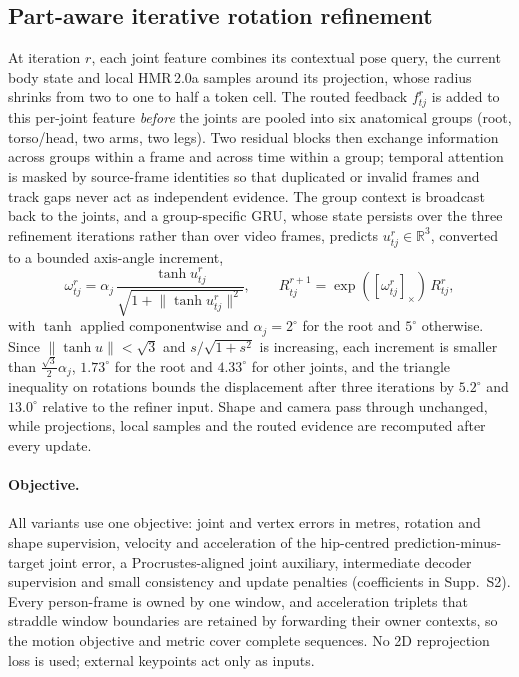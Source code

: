 \subsection{Part-aware iterative rotation refinement}
\label{sec:refiner}

At iteration $r$, each joint feature combines its contextual pose query, the current body state and local HMR\,2.0a samples around its projection, whose radius shrinks from two to one to half a token cell.
The routed feedback $f^r_{tj}$ is added to this per-joint feature \emph{before} the joints are pooled into six anatomical groups (root, torso/head, two arms, two legs).
Two residual blocks then exchange information across groups within a frame and across time within a group; temporal attention is masked by source-frame identities so that duplicated or invalid frames and track gaps never act as independent evidence.
The group context is broadcast back to the joints, and a group-specific GRU, whose state persists over the three refinement iterations rather than over video frames, predicts $u^r_{tj}\in\mathbb{R}^3$, converted to a bounded axis-angle increment,
\begin{equation}
  \omega^r_{tj} = \alpha_j\,\frac{\tanh u^r_{tj}}{\sqrt{1+\lVert\tanh u^r_{tj}\rVert^2}},\qquad R^{r+1}_{tj} = \exp([\omega^r_{tj}]_\times)\,R^r_{tj},
  \label{eq:bound}
\end{equation}
with $\tanh$ applied componentwise and $\alpha_j=2^\circ$ for the root and $5^\circ$ otherwise.
Since $\lVert\tanh u\rVert<\sqrt3$ and $s/\sqrt{1+s^2}$ is increasing, each increment is smaller than $\tfrac{\sqrt3}{2}\alpha_j$, \ie $1.73^\circ$ for the root and $4.33^\circ$ for other joints, and the triangle inequality on rotations bounds the displacement after three iterations by $5.2^\circ$ and $13.0^\circ$ relative to the refiner input.
Shape and camera pass through unchanged, while projections, local samples and the routed evidence are recomputed after every update.

\paragraph{Objective.}
All variants use one objective: joint and vertex errors in metres, rotation and shape supervision, velocity and acceleration of the hip-centred prediction-minus-target joint error, a Procrustes-aligned joint auxiliary, intermediate decoder supervision and small consistency and update penalties (coefficients in Supp.~S2).
Every person-frame is owned by one window, and acceleration triplets that straddle window boundaries are retained by forwarding their owner contexts, so the motion objective and metric cover complete sequences.
No 2D reprojection loss is used; external keypoints act only as inputs.

